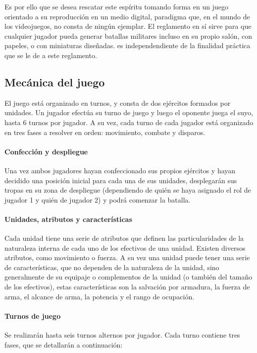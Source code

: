 Es por ello que se desea rescatar este espíritu tomando forma en un
juego orientado a su reproducción en un medio digital, paradigma que,
en el mundo de los videojuegos, no consta de ningún ejemplar. El
reglamento en sí sirve para que cualquier jugador pueda generar
batallas militares incluso en su propio salón, con papeles, o con
miniaturas diseñadas. \gom es independendiente de la finalidad
práctica que se le de a este reglamento.

\subsection*{Mecánica del juego}
El juego está organizado en turnos, y consta de dos ejércitos formados
por unidades. Un jugador efectúa su turno de
juego y luego el oponente juega el suyo, hasta 6 turnos por jugador. A
su vez, cada turno de cada jugador está organizado en tres fases a
resolver en orden: movimiento, combate y disparos.

\paragraph{Confección y despliegue}
Una vez ambos jugadores hayan confeccionado sus propios ejércitos y
hayan decidido una posición inicial para cada una de sus unidades,
desplegarán sus tropas en su zona de despliegue (dependiendo de quién
se haya asignado el rol de jugador 1 y quién de jugador 2) y podrá comenzar la batalla.

\paragraph{Unidades, atributos y características}
Cada unidad tiene una serie de atributos que definen las
particularidades de la naturaleza interna de cada uno de los efectivos
de una unidad. Existen
diversos atributos, como movimiento o fuerza. A su vez una unidad
puede tener una serie de características, que no dependen de la
naturaleza de la unidad, sino generalmente de su equipaje o
complementos de la unidad (o también del tamaño de los efectivos),
estas características son la salvación por armadura, la fuerza de
arma, el alcance de arma, la potencia y el rango de ocupación.

\paragraph{Turnos de juego}
Se realizarán hasta seis turnos alternos por jugador. Cada turno contiene tres fases, que se detallarán a continuación:

